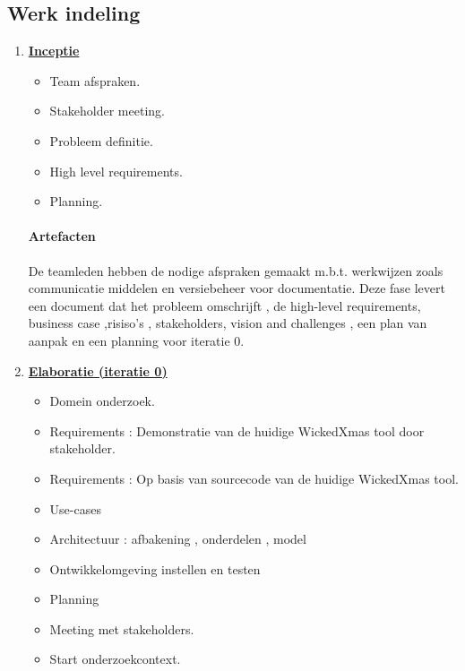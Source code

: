 
\subsection{Werk indeling}
\begin{enumerate}
\item \underline{\textbf{Inceptie}}
		\begin{itemize}
			\item Team afspraken.
			\item Stakeholder meeting.
			\item Probleem definitie.
			\item High level requirements.
			\item Planning. 
		\end{itemize}
		\paragraph{Artefacten}
		De teamleden hebben de nodige afspraken gemaakt m.b.t. werkwijzen zoals communicatie middelen en versiebeheer voor documentatie. Deze fase levert een document dat het probleem omschrijft , de high-level requirements, business case ,risiso's , stakeholders, vision and challenges , een plan van aanpak en een planning voor iteratie 0.
	
\item \underline{\textbf{Elaboratie (iteratie 0)}}
	\begin{itemize}
		\item Domein onderzoek.
		\item Requirements : Demonstratie van de huidige WickedXmas tool door stakeholder.
		\item Requirements : Op basis van sourcecode van de huidige WickedXmas tool.
		\item Use-cases
		\item Architectuur : afbakening , onderdelen , model
		\item Ontwikkelomgeving instellen en testen
		\item Planning
		\item Meeting met stakeholders.
		\item Start onderzoekcontext.
	\end{itemize}

\end{enumerate}
